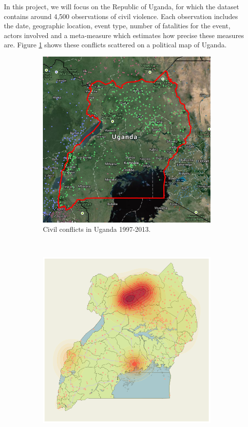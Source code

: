 \documentclass{article} %
\begin{document}
In this project, we will focus on the Republic of Uganda, for which the dataset contains around 4,500 observations of civil violence. Each observation includes the date, geographic location, event type, number of fatalities for the event, actors involved and a meta-measure which estimates how precise these measures are. Figure \ref{fig:map-points} shows these conflicts scattered on a political map of Uganda.

\begin{figure}
  \centering
  \begin{subfigure}[b]{0.5\textwidth}
    \centering
    \includegraphics[width=\textwidth]{figures/uganda}
    \caption{Civil conflicts in Uganda 1997-2013.}
    \label{fig:map-points}
  \end{subfigure}~\begin{subfigure}[b]{0.5\textwidth}
    \centering
    \includegraphics[width=\textwidth]{figures/map-with-smoothed-data}

\end{subfigure}
\end{figure}
\end{document}
